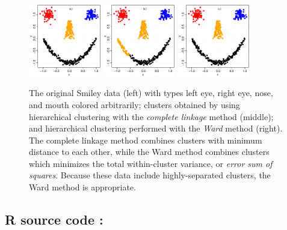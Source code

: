 \begin{figure}[H]
  \centering
    \includegraphics[width=0.28\textwidth]{images/actual_smiley.pdf}
    \quad
    \includegraphics[width=0.28\textwidth]{images/hierClust_smiley.pdf}
    \quad
    \includegraphics[width=0.28\textwidth]{images/hierClust_ward_smiley.pdf}
  \caption{The original Smiley data (left) with types left eye, right eye, nose, and mouth colored arbitrarily; clusters obtained by using hierarchical clustering with the \emph{complete linkage} method (middle); and hierarchical clustering performed with the \emph{Ward} method (right).  The complete linkage method combines clusters with minimum distance to each other, while the Ward method combines clusters which minimizes the total within-cluster variance, or \emph{error sum of squares}.  Because these data include highly-separated clusters, the Ward method is appropriate.}
\end{figure}

\newpage

\subsection{R source code :}

\begin{multicols*}{2}


\end{multicols*}

